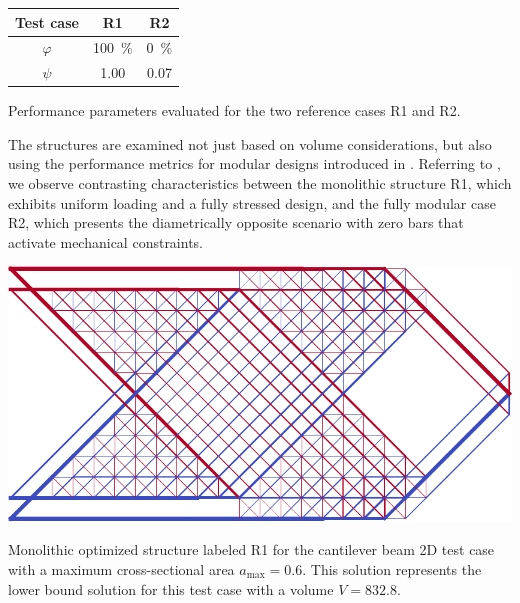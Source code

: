 \begin{margintable}
    \small
    \centering
    \begin{tabular}{ccc}
    \toprule
    \textbf{Test case} & \textbf{R1} & \textbf{R2}\\ \midrule
    $\varphi$ &\qty{100}{\percent}&\qty{0}{\percent}\\
    $\psi$  & 1.00&0.07   \\
    \bottomrule
    \end{tabular}
    \caption{Performance parameters evaluated for the two reference cases R1 and R2.}
    \label{tab:06_modular_cant_perf}    
\end{margintable}

The structures are examined not just based on volume considerations, but also using the performance metrics for modular designs introduced in . Referring to , we observe contrasting characteristics between the monolithic structure R1, which exhibits uniform loading and a fully stressed design, and the fully modular case R2, which presents the diametrically opposite scenario with zero bars that activate mechanical constraints.

\begin{marginfigure}
    \centering
    \includegraphics[width=\linewidth]{figures/06_DMO/00_cantilever_extremes/mono.pdf}
    \caption{Monolithic optimized structure labeled R1 for the cantilever beam 2D test case with a maximum cross-sectional area $a_\text{max}=0.6$. This solution represents the lower bound solution for this test case with a volume $V=832.8$.}
    \label{fig:06_cant_mono}
\end{marginfigure}


